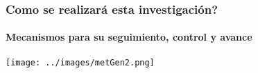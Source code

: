 \mode*
\begin{frame}[label=algoritmo_metodologia]
  \algoritmoMetodologiaTime
  \frametitle{Como se realizar\'a esta investigaci\'on?}
  \framesubtitle{Mecanismos para su seguimiento, control y avance}
  \begin{center}
    \texttt{[image: ../images/metGen2.png]}
  \end{center}
\end{frame}
